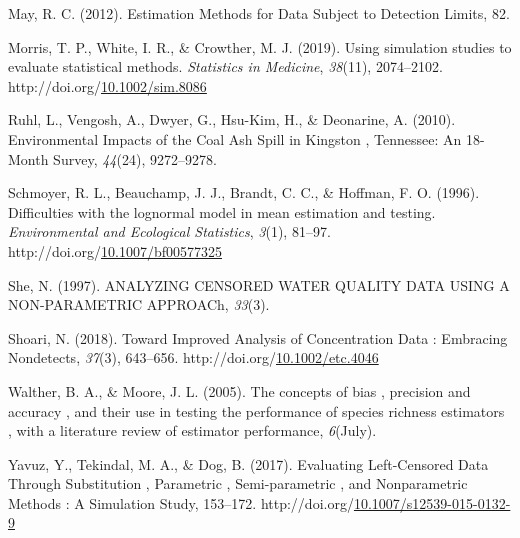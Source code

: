 \documentclass[12pt, twoside]{amherstthesis}
\newenvironment{CSLReferences}%
  {}%
  {\par}
\begin{document}
\begin{CSLReferences}{1}{0}
\leavevmode\hypertarget{ref-May2012}{}%
May, R. C. (2012). {Estimation Methods for Data Subject to Detection Limits}, 82.

\leavevmode\hypertarget{ref-Morris2019}{}%
Morris, T. P., White, I. R., \& Crowther, M. J. (2019). {Using simulation studies to evaluate statistical methods}. \emph{Statistics in Medicine}, \emph{38}(11), 2074--2102. http://doi.org/\href{https://doi.org/10.1002/sim.8086}{10.1002/sim.8086}

\leavevmode\hypertarget{ref-Ruhl2010}{}%
Ruhl, L., Vengosh, A., Dwyer, G., Hsu-Kim, H., \& Deonarine, A. (2010). {Environmental Impacts of the Coal Ash Spill in Kingston , Tennessee: An 18-Month Survey}, \emph{44}(24), 9272--9278.

\leavevmode\hypertarget{ref-Schmoyer1996}{}%
Schmoyer, R. L., Beauchamp, J. J., Brandt, C. C., \& Hoffman, F. O. (1996). {Difficulties with the lognormal model in mean estimation and testing}. \emph{Environmental and Ecological Statistics}, \emph{3}(1), 81--97. http://doi.org/\href{https://doi.org/10.1007/bf00577325}{10.1007/bf00577325}

\leavevmode\hypertarget{ref-She1997}{}%
She, N. (1997). {ANALYZING CENSORED WATER QUALITY DATA USING A NON-PARAMETRIC APPROACh}, \emph{33}(3).

\leavevmode\hypertarget{ref-Shoari2018}{}%
Shoari, N. (2018). {Toward Improved Analysis of Concentration Data : Embracing Nondetects}, \emph{37}(3), 643--656. http://doi.org/\href{https://doi.org/10.1002/etc.4046}{10.1002/etc.4046}

\leavevmode\hypertarget{ref-Walther2005}{}%
Walther, B. A., \& Moore, J. L. (2005). {The concepts of bias , precision and accuracy , and their use in testing the performance of species richness estimators , with a literature review of estimator performance}, \emph{6}(July).

\leavevmode\hypertarget{ref-Yavuz2017}{}%
Yavuz, Y., Tekindal, M. A., \& Dog, B. (2017). {Evaluating Left-Censored Data Through Substitution , Parametric , Semi-parametric , and Nonparametric Methods : A Simulation Study}, 153--172. http://doi.org/\href{https://doi.org/10.1007/s12539-015-0132-9}{10.1007/s12539-015-0132-9}

\end{CSLReferences}
\end{document}
